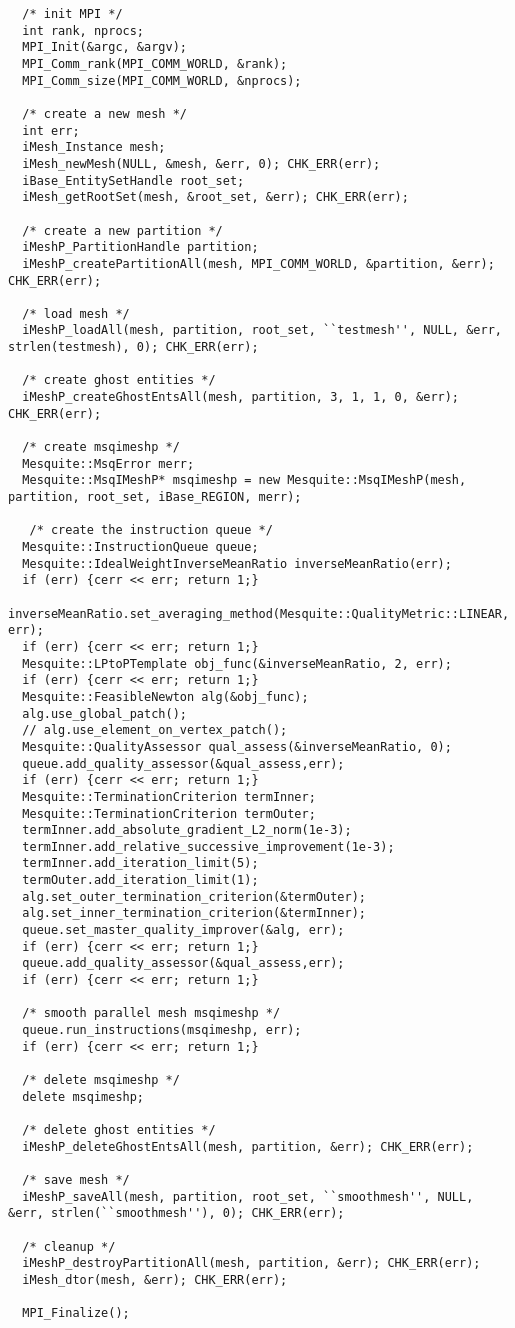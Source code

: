 \begin{verbatim}
  /* init MPI */
  int rank, nprocs;
  MPI_Init(&argc, &argv);
  MPI_Comm_rank(MPI_COMM_WORLD, &rank);
  MPI_Comm_size(MPI_COMM_WORLD, &nprocs);

  /* create a new mesh */
  int err;
  iMesh_Instance mesh;
  iMesh_newMesh(NULL, &mesh, &err, 0); CHK_ERR(err);
  iBase_EntitySetHandle root_set;
  iMesh_getRootSet(mesh, &root_set, &err); CHK_ERR(err);

  /* create a new partition */
  iMeshP_PartitionHandle partition;
  iMeshP_createPartitionAll(mesh, MPI_COMM_WORLD, &partition, &err); CHK_ERR(err);

  /* load mesh */
  iMeshP_loadAll(mesh, partition, root_set, ``testmesh'', NULL, &err, strlen(testmesh), 0); CHK_ERR(err);

  /* create ghost entities */
  iMeshP_createGhostEntsAll(mesh, partition, 3, 1, 1, 0, &err); CHK_ERR(err);

  /* create msqimeshp */
  Mesquite::MsqError merr;
  Mesquite::MsqIMeshP* msqimeshp = new Mesquite::MsqIMeshP(mesh, partition, root_set, iBase_REGION, merr);

   /* create the instruction queue */
  Mesquite::InstructionQueue queue;
  Mesquite::IdealWeightInverseMeanRatio inverseMeanRatio(err);
  if (err) {cerr << err; return 1;}
  inverseMeanRatio.set_averaging_method(Mesquite::QualityMetric::LINEAR, err);
  if (err) {cerr << err; return 1;}
  Mesquite::LPtoPTemplate obj_func(&inverseMeanRatio, 2, err);
  if (err) {cerr << err; return 1;}
  Mesquite::FeasibleNewton alg(&obj_func);
  alg.use_global_patch();
  // alg.use_element_on_vertex_patch();
  Mesquite::QualityAssessor qual_assess(&inverseMeanRatio, 0);
  queue.add_quality_assessor(&qual_assess,err);
  if (err) {cerr << err; return 1;}
  Mesquite::TerminationCriterion termInner;
  Mesquite::TerminationCriterion termOuter;
  termInner.add_absolute_gradient_L2_norm(1e-3);
  termInner.add_relative_successive_improvement(1e-3);
  termInner.add_iteration_limit(5);
  termOuter.add_iteration_limit(1);
  alg.set_outer_termination_criterion(&termOuter);
  alg.set_inner_termination_criterion(&termInner);
  queue.set_master_quality_improver(&alg, err);
  if (err) {cerr << err; return 1;}
  queue.add_quality_assessor(&qual_assess,err);
  if (err) {cerr << err; return 1;}

  /* smooth parallel mesh msqimeshp */
  queue.run_instructions(msqimeshp, err);
  if (err) {cerr << err; return 1;}

  /* delete msqimeshp */
  delete msqimeshp;

  /* delete ghost entities */
  iMeshP_deleteGhostEntsAll(mesh, partition, &err); CHK_ERR(err);

  /* save mesh */
  iMeshP_saveAll(mesh, partition, root_set, ``smoothmesh'', NULL, &err, strlen(``smoothmesh''), 0); CHK_ERR(err);

  /* cleanup */
  iMeshP_destroyPartitionAll(mesh, partition, &err); CHK_ERR(err);
  iMesh_dtor(mesh, &err); CHK_ERR(err);

  MPI_Finalize();

\end{verbatim}
